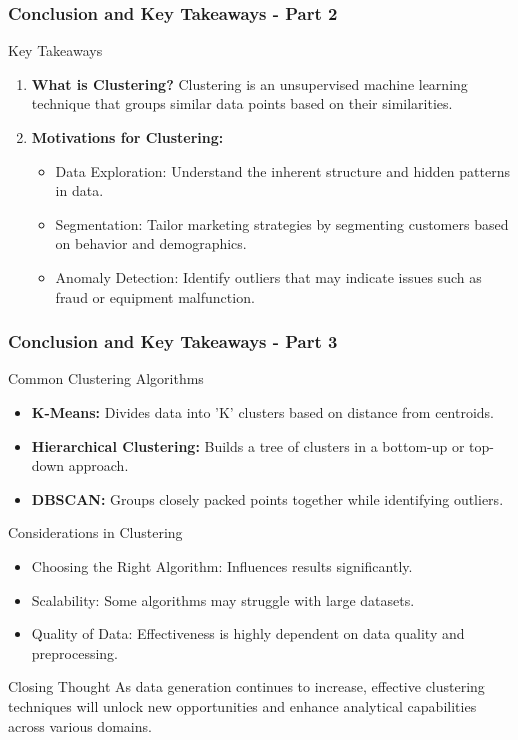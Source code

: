 \documentclass[aspectratio=169]{beamer}
\begin{document}
\begin{frame}[fragile]
    \frametitle{Conclusion and Key Takeaways - Part 2}
    \begin{block}{Key Takeaways}
        \begin{enumerate}
            \item \textbf{What is Clustering?} Clustering is an unsupervised machine learning technique that groups similar data points based on their similarities.
            
            \item \textbf{Motivations for Clustering:}
            \begin{itemize}
                \item Data Exploration: Understand the inherent structure and hidden patterns in data.
                \item Segmentation: Tailor marketing strategies by segmenting customers based on behavior and demographics.
                \item Anomaly Detection: Identify outliers that may indicate issues such as fraud or equipment malfunction.
            \end{itemize}
        \end{enumerate}
    \end{block}
\end{frame}

\begin{frame}[fragile]
    \frametitle{Conclusion and Key Takeaways - Part 3}
    \begin{block}{Common Clustering Algorithms}
        \begin{itemize}
            \item \textbf{K-Means:} Divides data into 'K' clusters based on distance from centroids.
            \item \textbf{Hierarchical Clustering:} Builds a tree of clusters in a bottom-up or top-down approach.
            \item \textbf{DBSCAN:} Groups closely packed points together while identifying outliers.
        \end{itemize}
    \end{block}
    \begin{block}{Considerations in Clustering}
        \begin{itemize}
            \item Choosing the Right Algorithm: Influences results significantly.
            \item Scalability: Some algorithms may struggle with large datasets.
            \item Quality of Data: Effectiveness is highly dependent on data quality and preprocessing.
        \end{itemize}
    \end{block}
    \begin{block}{Closing Thought}
        As data generation continues to increase, effective clustering techniques will unlock new opportunities and enhance analytical capabilities across various domains.
    \end{block}
\end{frame}
\end{document}
